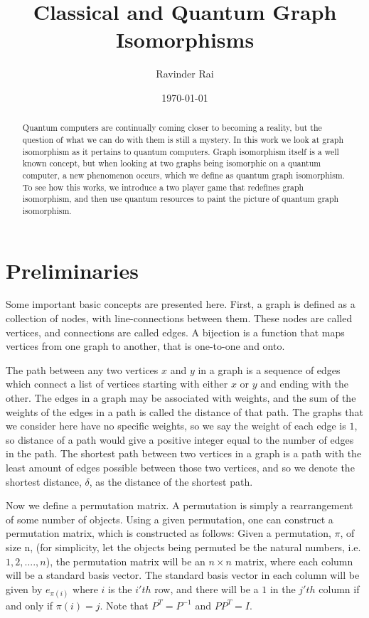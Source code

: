 \documentclass[12pt]{article}
\title{\textbf{Classical and Quantum Graph Isomorphisms}}
\author{Ravinder Rai}
\date{\today}
\theoremstyle{definition}
\theoremstyle{proposition}
\theoremstyle{lemma}
\begin{document}
 

\maketitle


\begin{abstract}
Quantum computers are continually coming closer to becoming a reality, but the question of what we can do with them is still a mystery. In this work we look at graph isomorphism as it pertains to quantum computers. Graph isomorphism itself is a well known concept, but when looking at two graphs being isomorphic on a quantum computer, a new phenomenon occurs, which we define as quantum graph isomorphism. To see how this works, we introduce a two player game that redefines graph isomorphism, and then use quantum resources to paint the picture of quantum graph isomorphism. 
\end{abstract}

\newpage
\section{Preliminaries}
Some important basic concepts are presented here. First, a graph is defined as a collection of nodes, with line-connections between them. These nodes are called vertices, and connections are called edges. A bijection is a function that maps vertices from one graph to another, that is one-to-one and onto.

The path between any two vertices $x$ and $y$ in a graph is a sequence of edges which connect a list of vertices starting with either $x$ or $y$ and ending with the other. The edges in a graph may be associated with weights, and the sum of the weights of the edges in a path is called the distance of that path. The graphs that we consider here have no specific weights, so we say the weight of each edge is $1$, so distance of a path would give a positive integer equal to the number of edges in the path. The shortest path between two vertices in a graph is a path with the least amount of edges possible between those two vertices, and so we denote the shortest distance, $\delta$, as the distance of the shortest path. 


Now we define a permutation matrix. A permutation is simply a rearrangement of some number of objects. Using a given permutation, one can construct a permutation matrix, which is constructed as follows: Given a permutation, $\pi$, of size n, (for simplicity, let the objects being permuted be the natural numbers, i.e. $1, 2, ...., n$), the permutation matrix will be an $n \times n$ matrix, where each column will be a standard basis vector. The standard basis vector in each column will be given by $e_{\pi(i)}$ where $i$ is the $i'th$ row, and there will be a $1$ in the $j'th$ column if and only if $\pi(i) = j$. Note that $P^T = P^{-1}$ and $PP^T = I$. 
\end{document}
